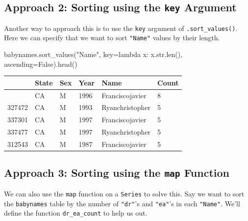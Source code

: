 \documentclass[
  letterpaper,
  DIV=11,
  numbers=noendperiod]{scrreprt}
\newenvironment{Shaded}{\begin{snugshade}}{\end{snugshade}}
\newcommand{\BuiltInTok}[1]{\textcolor[rgb]{0.00,0.23,0.31}{#1}}
\newcommand{\KeywordTok}[1]{\textcolor[rgb]{0.00,0.23,0.31}{#1}}
\newcommand{\NormalTok}[1]{\textcolor[rgb]{0.00,0.23,0.31}{#1}}
\newcommand{\OperatorTok}[1]{\textcolor[rgb]{0.37,0.37,0.37}{#1}}
\newcommand{\StringTok}[1]{\textcolor[rgb]{0.13,0.47,0.30}{#1}}
\newcommand{\VariableTok}[1]{\textcolor[rgb]{0.07,0.07,0.07}{#1}}
\begin{document}
\subsection{\texorpdfstring{Approach 2: Sorting using the \texttt{key}
Argument}{Approach 2: Sorting using the key Argument}}\label{approach-2-sorting-using-the-key-argument}

Another way to approach this is to use the \texttt{key} argument of
\texttt{.sort\_values()}. Here we can specify that we want to sort
\texttt{"Name"} values by their length.

\begin{Shaded}
\begin{Highlighting}[]
\NormalTok{babynames.sort\_values(}\StringTok{"Name"}\NormalTok{, key}\OperatorTok{=}\KeywordTok{lambda}\NormalTok{ x: x.}\BuiltInTok{str}\NormalTok{.}\BuiltInTok{len}\NormalTok{(), ascending}\OperatorTok{=}\VariableTok{False}\NormalTok{).head()}
\end{Highlighting}
\end{Shaded}

\begin{longtable}[]{@{}llllll@{}}
\toprule\noalign{}
& State & Sex & Year & Name & Count \\
\midrule\noalign{}
\endhead
\bottomrule\noalign{}
\endlastfoot
334166 & CA & M & 1996 & Franciscojavier & 8 \\
327472 & CA & M & 1993 & Ryanchristopher & 5 \\
337301 & CA & M & 1997 & Franciscojavier & 5 \\
337477 & CA & M & 1997 & Ryanchristopher & 5 \\
312543 & CA & M & 1987 & Franciscojavier & 5 \\
\end{longtable}

\subsection{\texorpdfstring{Approach 3: Sorting using the \texttt{map}
Function}{Approach 3: Sorting using the map Function}}\label{approach-3-sorting-using-the-map-function}

We can also use the \texttt{map} function on a \texttt{Series} to solve
this. Say we want to sort the \texttt{babynames} table by the number of
\texttt{"dr"}'s and \texttt{"ea"}'s in each \texttt{"Name"}. We'll
define the function \texttt{dr\_ea\_count} to help us out.
\end{document}
